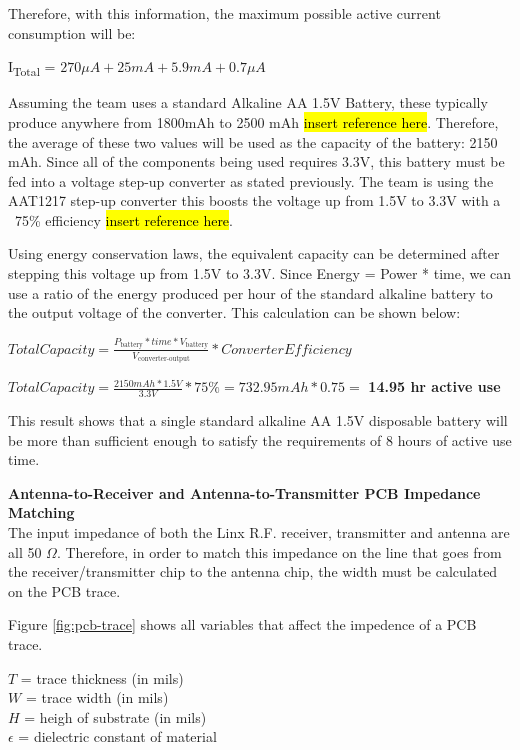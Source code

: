 \documentclass[letterpaper,10pt]{article}
\begin{document}
\begin{spacing}{1.15}
Therefore, with this information, the maximum possible active current consumption will be:
\begin{center}{I\textsubscript{Total} = $270 \mu A + 25 mA + 5.9 mA + 0.7 \mu A$}\end{center}

Assuming the team uses a standard Alkaline AA 1.5V Battery, these typically produce anywhere from 1800mAh to 2500 mAh \hl{insert reference here}. Therefore, the average of these two values will be used as the capacity of the battery: 2150 mAh. Since all of the components being used requires 3.3V, this battery must be fed into a voltage step-up converter as stated previously. The team is using the AAT1217 step-up converter this boosts the voltage up from 1.5V to 3.3V with a ~75\% efficiency \hl{insert reference here}.

Using energy conservation laws, the equivalent capacity can be determined after stepping this voltage up from 1.5V to 3.3V. Since Energy = Power * time, we can use a ratio of the energy produced per hour of the standard alkaline battery to the output voltage of the converter. This calculation can be shown below:

\begin{center} 
$Total Capacity = \frac{P_\textrm{battery}* time *  V_\textrm{battery}} {V_\textrm{converter-output}} * Converter Efficiency$

$ Total Capacity = \frac{2150 mAh *  1.5V} {3.3V} * 75\% = 732.95 mAh * 0.75 =$ \textbf{14.95 hr active use} 
\end{center}

This result shows that a single standard alkaline AA 1.5V disposable battery will be more than sufficient enough to satisfy the requirements of 8 hours of active use time.

\normalsize\textbf{Antenna-to-Receiver and Antenna-to-Transmitter PCB Impedance Matching} \\
The input impedance of both the Linx R.F. receiver, transmitter and antenna are all 50 $\Omega$. Therefore, in order to match this impedance on the line that goes from the receiver/transmitter chip to the antenna chip, the width must be calculated on the PCB trace. 

Figure \ref{fig:pcb-trace} shows all variables that affect the impedence of a PCB trace. 

\begin{center}
	$T $ = trace thickness (in mils) \\
	$W$ = trace width  (in mils) \\
	$H$ = heigh of substrate (in mils) \\
	$\epsilon$ = dielectric constant of material
\end{center}


\end{spacing}
\end{document}

